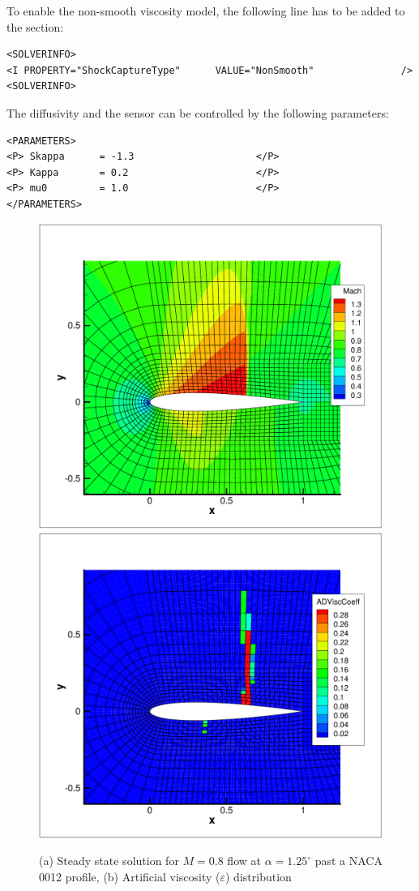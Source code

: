 To enable the non-smooth viscosity model, the following line has to be added to the  section:
\begin{lstlisting}[style=XmlStyle]
<SOLVERINFO>
<I PROPERTY="ShockCaptureType"      VALUE="NonSmooth"               />
<SOLVERINFO>
\end{lstlisting}
The diffusivity and the sensor can be controlled by the following parameters:
\begin{lstlisting}[style=XmlStyle]
<PARAMETERS>
<P> Skappa 	 	= -1.3                     </P>
<P> Kappa 	 	= 0.2                      </P>
<P> mu0 	  	= 1.0                      </P>
</PARAMETERS>
\end{lstlisting}

\begin{figure}[!htbp]
\begin{center}
\includegraphics[width = 0.47 \textwidth]{img/Mach_P4.pdf}
\includegraphics[width = 0.47 \textwidth]{img/ArtVisc_P4.pdf}
\caption{(a) Steady state solution for $M=0.8$ flow at $\alpha = 1.25^\circ$ past a NACA 0012 profile, (b) Artificial viscosity ($\varepsilon$) distribution}
\label{fig:}
\end{center}
\end{figure}

